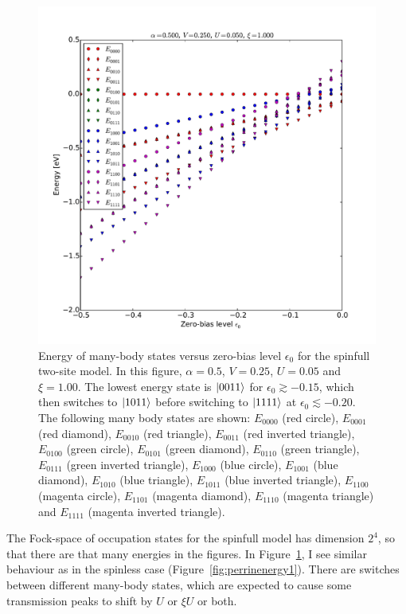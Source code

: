 \begin{figure}[htb]
    \centering
    \includegraphics[height=.45\textheight]{pdf/energy/pespin_distribution_u1_k2.pdf}
    \caption{Energy of many-body states versus zero-bias level $\epsilon_0$ for the spinfull two-site model. In this figure, $\alpha=0.5$, $V=0.25$, $U=0.05$ and $\xi=1.00$. The lowest energy state is $\ket{0011}$ for $\epsilon_0\gtrsim -0.15$, which then switches to $\ket{1011}$ before switching to $\ket{1111}$ at $\epsilon_0 \lesssim -0.20$. The following many body states are shown: $E_{0000}$ (red circle),  $E_{0001}$ (red diamond),  $E_{0010}$ (red triangle),  $E_{0011}$ (red inverted triangle), $E_{0100}$ (green circle), $E_{0101}$ (green diamond), $E_{0110}$ (green triangle), $E_{0111}$ (green inverted triangle),  $E_{1000}$ (blue circle),  $E_{1001}$ (blue diamond), 
    $E_{1010}$ (blue triangle),  $E_{1011}$ (blue inverted triangle),  $E_{1100}$ (magenta circle),  $E_{1101}$ (magenta diamond), $E_{1110}$ (magenta triangle) and $E_{1111}$ (magenta inverted triangle). }
    \label{fig:perspinenergy12}
\end{figure}  


The Fock-space of occupation states for the spinfull model has dimension $2^4$, so that there are that many energies in the figures. In Figure~\ref{fig:perspinenergy12}, I see similar behaviour as in the spinless case (Figure~\ref{fig:perrinenergy1}). There are switches between different many-body states, which are expected to cause some transmission peaks to shift by $U$ or $\xi U$ or both. 

